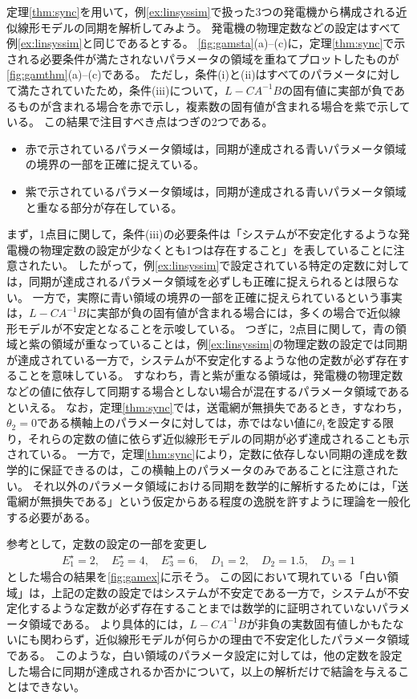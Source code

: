 \documentclass[tombow,dvipdfmx]{corona-a5}
\begin{document}
\begin{例}[正実性や特異摂動近似に基づく近似線形モデルの同期解析]\label{ex:linthm}
定理\ref{thm:sync}を用いて，例\ref{ex:linsyssim}で扱った3つの発電機から構成される近似線形モデルの同期を解析してみよう。
発電機の物理定数などの設定はすべて例\ref{ex:linsyssim}と同じであるとする。
\ref{fig:gamsta}(a)--(c)に，定理\ref{thm:sync}で示される必要条件が満たされないパラメータの領域を重ねてプロットしたものが\ref{fig:gamthm}(a)--(c)である。
ただし，条件(i)と(ii)はすべてのパラメータに対して満たされていたため，条件(iii)について，$L-CA^{-1}B$の固有値に実部が負であるものが含まれる場合を赤で示し，複素数の固有値が含まれる場合を紫で示している。
この結果で注目すべき点はつぎの2つである。
\begin{itemize}
\item 赤で示されているパラメータ領域は，同期が達成される青いパラメータ領域の境界の一部を正確に捉えている。
\item 紫で示されているパラメータ領域は，同期が達成される青いパラメータ領域と重なる部分が存在している。
\end{itemize}
まず，1点目に関して，条件(iii)の必要条件は「システムが不安定化するような発電機の物理定数の設定が少なくとも1つは存在すること」を表していることに注意されたい。
したがって，例\ref{ex:linsyssim}で設定されている特定の定数に対しては，同期が達成されるパラメータ領域を必ずしも正確に捉えられるとは限らない。
一方で，実際に青い領域の境界の一部を正確に捉えられているという事実は，$L-CA^{-1}B$に実部が負の固有値が含まれる場合には，多くの場合で近似線形モデルが不安定となることを示唆している。
つぎに，2点目に関して，青の領域と紫の領域が重なっていることは，例\ref{ex:linsyssim}の物理定数の設定では同期が達成されている一方で，システムが不安定化するような他の定数が必ず存在することを意味している。
すなわち，青と紫が重なる領域は，発電機の物理定数などの値に依存して同期する場合としない場合が混在するパラメータ領域であるといえる。
なお，定理\ref{thm:sync}では，送電網が無損失であるとき，すなわち，$\theta_2=0$である横軸上のパラメータに対しては，赤ではない値に$\theta_1$を設定する限り，それらの定数の値に依らず近似線形モデルの同期が必ず達成されることも示されている。
一方で，定理\ref{thm:sync}により，定数に依存しない同期の達成を数学的に保証できるのは，この横軸上のパラメータのみであることに注意されたい。
それ以外のパラメータ領域における同期を数学的に解析するためには，「送電網が無損失である」という仮定からある程度の逸脱を許すように理論を一般化する必要がある。

参考として，定数の設定の一部を変更し
\begin{align*}
E_1^{\star}=2
,\quad
E_2^{\star}=4
,\quad
E_3^{\star}=6
,\quad
D_1 = 2
,\quad
D_2 = 1.5
,\quad
D_3 = 1
\end{align*}
とした場合の結果を\ref{fig:gamex}に示そう。
この図において現れている「白い領域」は，上記の定数の設定ではシステムが不安定である一方で，システムが不安定化するような定数が必ず存在することまでは数学的に証明されていないパラメータ領域である。
より具体的には，$L-CA^{-1}B$が非負の実数固有値しかもたないにも関わらず，近似線形モデルが何らかの理由で不安定化したパラメータ領域である。
このような，白い領域のパラメータ設定に対しては，他の定数を設定した場合に同期が達成されるか否かについて，以上の解析だけで結論を与えることはできない。
\end{例}
\end{document}

